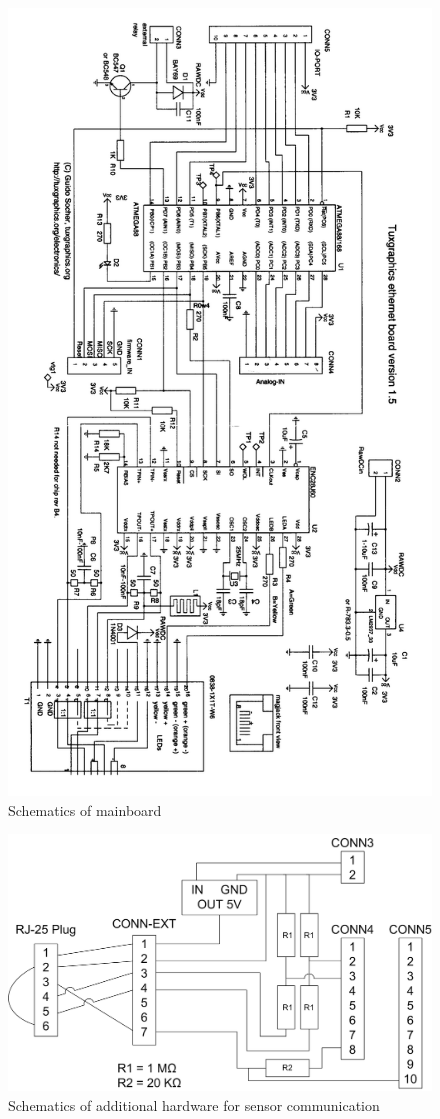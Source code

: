 \begin{figure}[H]
    \centering
    \includegraphics[width=0.7\linewidth]{graphics/schematics1.png}
    \caption{Schematics of mainboard}
    \label{fig:mainboard_schematic1}
\end{figure}

\begin{figure}[H]
    \centering
    \includegraphics[width=\linewidth]{graphics/schematics.png}
    \caption{Schematics of additional hardware for sensor communication}
    \label{fig:mainboard_schematic}
\end{figure}

